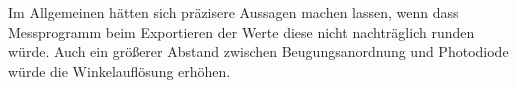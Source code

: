 \documentclass[
	a4paper,
	12pt,
	pagesize,
	ngerman
]{scrartcl}
\begin{document}
	Im Allgemeinen hätten sich präzisere Aussagen machen lassen, wenn dass Messprogramm beim Exportieren der Werte diese nicht nachträglich runden würde.
	Auch ein größerer Abstand zwischen Beugungsanordnung und Photodiode würde die Winkelauflösung erhöhen.
	
	\printbibliography
\end{document}
